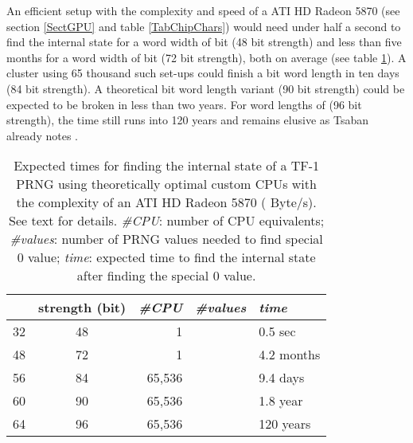\documentclass{article}
\begin{document}
An efficient setup with the complexity and speed of a ATI HD Radeon 5870 (see 
section \ref{SectGPU} and table \ref{TabChipChars}) would need under half a 
second to find the internal state
for a word width of  bit (48 bit strength) and less than five months
for a word width of  bit (72 bit strength), both on average (see table
\ref{TabTF-1}).
A cluster using 65 thousand such set-ups could finish a  bit word length
in ten days (84 bit strength). A theoretical  bit word length variant
(90 bit strength) could be expected to be broken in less than two years.
For word lengths of  (96 bit strength), the time still runs into 120 years 
and remains elusive as Tsaban already notes \cite{tsaban:0507063}. 

\begin{comment}
w=32: 
(120 * (1.5 * 32) * (2^((1.5 * 32) - 1))) / (1.8275 * (10^18)) = 0.443583s
w=48:
((120 * (1.5 * 48) * (2^((1.5 * 48) - 1))) / (1.8275 * (10^18))) / (3 600 * 24 * 30.5) = 4.23616109 months
w=56:
(120 * (1.5 * 56) * (2^((1.5 * 56) - 1))) / (1.8275 * (10^18) * (2^16) * 3 600 * 24) = 9.42104576 days
w=60:
(120 * (1.5 * 60) * (2^((1.5 * 60) - 1))) / (1.8275 * (10^18) * (2^16) * 3 600 * 24 * 365) = 1.76990292 year
w=64:
(120 * (1.5 * 64) * (2^((1.5 * 64) - 1))) / (1.8275 * (10^18) * (2^16) * 3 600 * 24 * 365) = 120.825373 year
\end{comment}

\begin{table}[b]
\begin{center}
\caption{Expected times for finding the internal state of a TF-1 PRNG \cite{tsaban:0507063} 
using theoretically optimal custom CPUs with the complexity of an ATI HD Radeon 5870 
( Byte/s). See text for details.\newline
\textit{\#CPU}: number of CPU equivalents; \textit{\#values}: number of PRNG values needed to find special 0 value;
\textit{time}: expected time to find the internal state after finding the special 0 value.}
\begin{tabular}{lcrrl}
 & strength (bit) & \textit{\#CPU} & \textit{\#values} & \textit{time} \\
\hline
32 & 48 & 1 &  & 0.5 sec \\
48 & 72 & 1 & & 4.2 months \\
56 & 84 & 65,536 &  & 9.4 days \\
60 & 90 & 65,536 &  & 1.8 year \\
64 & 96 & 65,536 &  & 120 years \\
\end{tabular}
\label{TabTF-1}
\end{center}
\end{table}
\end{document}
